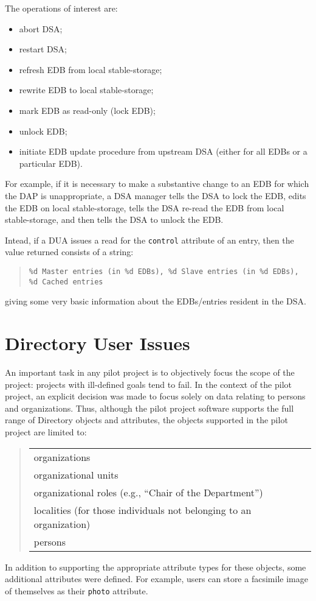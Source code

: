 The operations of interest are:
\begin{itemize}
\item	abort DSA;

\item	restart DSA;

\item	refresh EDB from local stable-storage;

\item	rewrite EDB to local stable-storage;

\item	mark EDB as read-only (lock EDB);

\item	unlock EDB;

\item	initiate EDB update procedure from upstream DSA
	(either for all EDBs or a particular EDB).
\end{itemize}
For example,
if it is necessary to make a substantive change to an EDB for which the DAP is
unappropriate,
a DSA manager tells the DSA to lock the EDB,
edits the EDB on local stable-storage,
tells the DSA re-read the EDB from local stable-storage,
and then tells the DSA to unlock the EDB.

Intead,
if a DUA issues a read for the \verb"control" attribute of an entry,
then the value returned consists of a string:
\begin{quote}\scriptsize\begin{verbatim}
%d Master entries (in %d EDBs), %d Slave entries (in %d EDBs), %d Cached entries
\end{verbatim}\end{quote}
giving some very basic information about the EDBs/entries resident in the DSA.

\newpage
\section	{Directory User Issues}
An important task in any pilot project is to objectively focus the scope of
the project:
projects with ill-defined goals tend to fail.
In the context of the pilot project,
an explicit decision was made to focus solely on data relating to persons and
organizations.
Thus, although the pilot project software supports the full range of Directory
objects and attributes, the objects supported in the pilot project are limited
to:
\begin{quote}\small\begin{tabular}{l}
organizations\\ organizational units\\ organizational roles (e.g., ``Chair of
the Department'')\\ localities (for those individuals not belonging to an
organization)\\ persons
\end{tabular}\end{quote}
In addition to supporting the appropriate attribute types for these objects,
some additional attributes were defined.  For example, users can store a
facsimile image of themselves as their \verb"photo" attribute.

